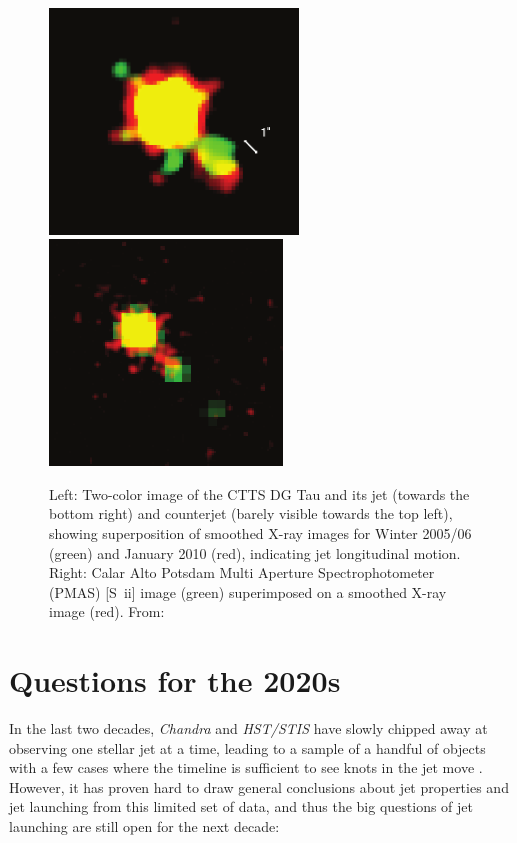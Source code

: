 \documentclass[12pt]{article}
\begin{document}
\begin{figure}[htb]
\centering
\includegraphics[height=6cm]{xjetmotion.png}
\includegraphics[height=6cm]{xjetmotion2.png}
\caption{Left: Two-color image of the CTTS DG Tau and its jet (towards the bottom right) and counterjet (barely visible towards the top left), showing superposition of smoothed X-ray
images for Winter 2005/06 (green) and January 2010 (red), indicating jet
longitudinal motion. Right: Calar Alto Potsdam Multi Aperture Spectrophotometer
(PMAS) [S~{\sc ii}] image (green) superimposed on a smoothed X-ray image
(red). From: }
\label{fig:Xray}
\end{figure}

\section{Questions for the 2020s}
In the last two decades, \emph{Chandra} and \emph{HST/STIS} have slowly chipped away at observing one stellar jet at a time, leading to a sample of a handful of objects with a few cases where the timeline is sufficient to see knots in the jet move \citep[e.g.][]{2011A&A...530A.123S}. However, it has proven hard to draw general conclusions about jet properties and jet launching from this limited set of data, and thus the big questions of jet launching are still open for the next decade:
\end{document}
